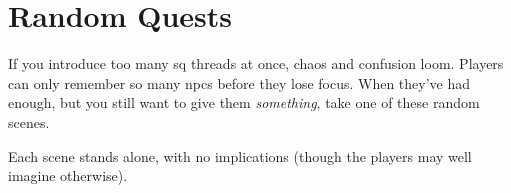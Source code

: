 \section{Random Quests}

If you introduce too many \gls{sq} threads at once, chaos and confusion loom.
Players can only remember so many \glspl{npc} before they lose focus.
When they've had enough, but you still want to give them \emph{something}, take one of these random scenes.

Each scene stands alone, with no implications (though the players may well imagine otherwise).


